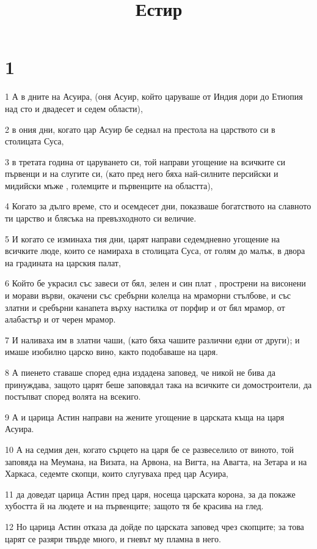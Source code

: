 

\title{Естир}


\chapter{1}

\par 1 А в дните на Асуира, (оня Асуир, който царуваше от Индия дори до Етиопия над сто и двадесет и седем области),
\par 2 в ония дни, когато цар Асуир бе седнал на престола на царството си в столицата Суса,
\par 3 в третата година от царуването си, той направи угощение на всичките си първенци и на слугите си, (като пред него бяха най-силните персийски и мидийски мъже , големците и първенците на областта),
\par 4 Когато за дълго време, сто и осемдесет дни, показваше богатството на славното ти царство и блясъка на превъзходното си величие.
\par 5 И когато се изминаха тия дни, царят направи седемдневно угощение на всичките люде, които се намираха в столицата Суса, от голям до малък, в двора на градината на царския палат,
\par 6 Който бе украсил със завеси от бял, зелен и син плат , прострени на висонени и морави върви, окачени със сребърни колелца на мраморни стълбове, и със златни и сребърни канапета върху настилка от порфир и от бял мрамор, от алабастър и от черен мрамор.
\par 7 И наливаха им в златни чаши, (като бяха чашите различни едни от други); и имаше изобилно царско вино, както подобаваше на царя.
\par 8 А пиенето ставаше според една издадена заповед, че никой не бива да принуждава, защото царят беше заповядал така на всичките си домостроители, да постъпват според волята на всекиго.
\par 9 А и царица Астин направи на жените угощение в царската къща на царя Асуира.
\par 10 А на седмия ден, когато сърцето на царя бе се развеселило от виното, той заповяда на Меумана, на Визата, на Арвона, на Вигта, на Авагта, на Зетара и на Харкаса, седемте скопци, които слугуваха пред цар Асуира,
\par 11 да доведат царица Астин пред царя, носеща царската корона, за да покаже хубостта й на людете и на първенците; защото тя бе красива на глед.
\par 12 Но царица Астин отказа да дойде по царската заповед чрез скопците; за това царят се разяри твърде много, и гневът му пламна в него.
